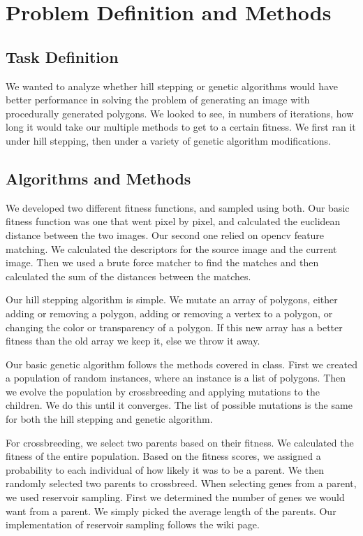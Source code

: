 \documentclass[12pt,letterpaper]{article}
\begin{document}
\section{Problem Definition and Methods}

\subsection{Task Definition}
We wanted to analyze whether hill stepping or genetic algorithms would have better performance in solving the problem of generating an image with procedurally generated polygons. We looked to see, in numbers of iterations, how long it would take our multiple methods to get to a certain fitness. We first ran it under hill stepping, then under a variety of genetic algorithm modifications.

\subsection{Algorithms and Methods}
We developed two different fitness functions, and sampled using both. Our basic fitness function was one that went pixel by pixel, and calculated the euclidean distance between the two images. Our second one relied on opencv feature matching. We calculated the descriptors for the source image and the current image.  Then we used a brute force matcher to find the matches and then calculated the sum of the distances between the matches.

Our hill stepping algorithm is simple. We mutate an array of polygons, either adding or removing a polygon, adding or removing a vertex to a polygon, or changing the color or transparency of a polygon. If this new array has a better fitness than the old array we keep it, else we throw it away.

Our basic genetic algorithm follows the methods covered in class. First we created a population of random instances, where an instance is a list of polygons.  Then we evolve the population by crossbreeding and applying mutations to the children.  We do this until it converges.  The list of possible mutations is the same for both the hill stepping and genetic algorithm.

For crossbreeding, we select two parents based on their fitness.  We calculated the fitness of the entire population.  Based on the fitness scores, we assigned a probability to each individual of how likely it was to be a parent.  We then randomly selected two parents to crossbreed.  When selecting genes from a parent, we used reservoir sampling.  First we determined the number of genes we would want from a parent.  We simply picked the average length of the parents.  Our implementation of reservoir sampling follows the wiki page.
\end{document}
